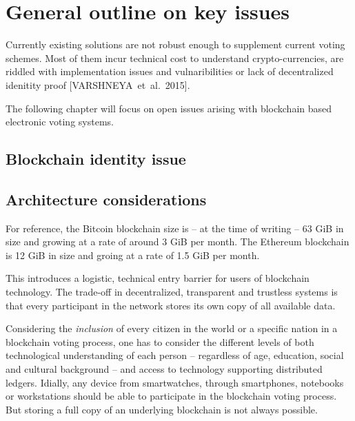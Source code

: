 
\section{General outline on key issues}
Currently existing solutions are not robust enough to supplement current voting schemes. Most of them incur technical cost to understand crypto-currencies, are riddled with implementation issues and vulnaribilities or lack of decentralized idenitity proof [VARSHNEYA~et~al.~2015].\par
The following chapter will focus on open issues arising with blockchain based electronic voting systems.

\subsection{Blockchain identity issue}

\subsection{Architecture considerations}
For reference, the Bitcoin blockchain size is -- at the time of writing -- 63 GiB in size and growing at a rate of around 3 GiB per month. The Ethereum blockchain is 12 GiB in size and groing at a rate of 1.5 GiB per month.\par
This introduces a logistic, technical entry barrier for users of blockchain technology. The trade-off in decentralized, transparent and trustless systems is that every participant in the network stores its own copy of all available data.\par
Considering the \textit{inclusion} of every citizen in the world or a specific nation in a blockchain voting process, one has to consider the different levels of both technological understanding of each person -- regardless of age, education, social and cultural background -- and access to technology supporting distributed ledgers. Idially, any device from smartwatches, through smartphones, notebooks or workstations should be able to participate in the blockchain voting process. But storing a full copy of an underlying blockchain is not always possible.
